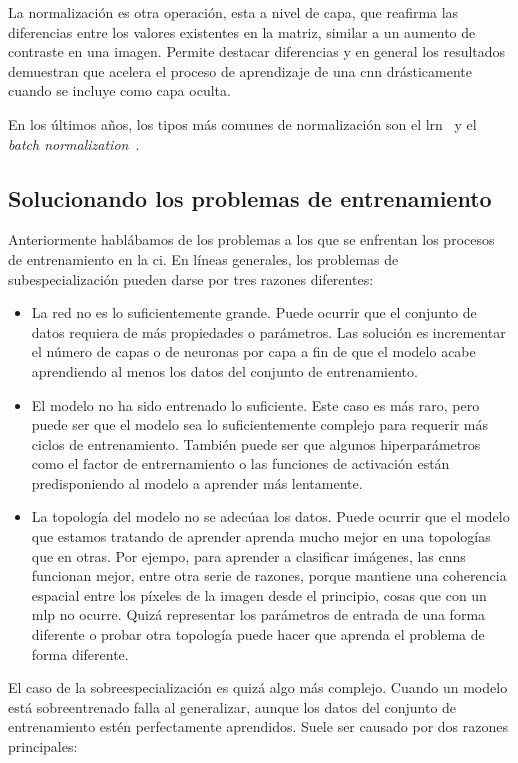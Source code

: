 La normalización es otra operación, esta a nivel de capa, que reafirma las diferencias entre los valores existentes en la matriz, similar a un aumento de contraste en una imagen. Permite destacar diferencias y en general los resultados demuestran que acelera el proceso de aprendizaje de una \ac{cnn} drásticamente cuando se incluye como capa oculta.

En los últimos años, los tipos más comunes de normalización son el \gls{lrn}~\cite{robinson2007explaining} y el \textit{batch normalization}~\cite{ioffe2015batch}.

\subsection{Solucionando los problemas de entrenamiento}

Anteriormente hablábamos de los problemas a los que se enfrentan los procesos de entrenamiento en la \gls{ci}. En líneas generales, los problemas de subespecialización pueden darse por tres razones diferentes:

\begin{itemize}
	\item La red no es lo suficientemente grande. Puede ocurrir que el conjunto de datos requiera de más propiedades o parámetros. Las solución es incrementar el número de capas o de neuronas por capa a fin de que el modelo acabe aprendiendo al menos los datos del conjunto de entrenamiento.
	\item El modelo no ha sido entrenado lo suficiente. Este caso es más raro, pero puede ser que el modelo sea lo suficientemente complejo para requerir más ciclos de entrenamiento. También puede ser que algunos hiperparámetros como el factor de entrernamiento o las funciones de activación están predisponiendo al modelo a aprender más lentamente.
	\item La topología del modelo no se adecúaa los datos. Puede ocurrir que el modelo que estamos tratando de aprender aprenda mucho mejor en una topologías que en otras. Por ejempo, para aprender a clasificar imágenes, las \glspl{cnn} funcionan mejor, entre otra serie de razones, porque mantiene una coherencia espacial entre los píxeles de la imagen desde el principio, cosas que con un \gls{mlp} no ocurre. Quizá representar los parámetros de entrada de una forma diferente o probar otra topología puede hacer que aprenda el problema de forma diferente.
\end{itemize}

El caso de la sobreespecialización es quizá algo más complejo. Cuando un modelo está sobreentrenado falla al generalizar, aunque los datos del conjunto de entrenamiento estén perfectamente aprendidos. Suele ser causado por dos razones principales:

